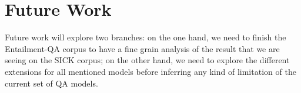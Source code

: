 \chapter{Future Work}
\label{ch05:futurework}

Future work will explore two branches: on the one hand, we need to finish the Entailment-QA corpus to have a fine grain analysis of the result that we are seeing on the SICK corpus; on the other hand, we need to explore the different extensions for all mentioned models \cite{MaCKZRSG17, Serban:2016a} before inferring any kind of limitation of the current set of QA models.